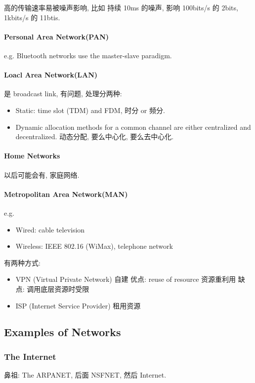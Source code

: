 高的传输速率易被噪声影响, 比如 持续 10ms 的噪声, 影响 100bits/s 的 2bits, 1kbits/s 的 11btis. 

\paragraph{Personal Area Network(PAN)} e.g. Bluetooth networks use the master-slave paradigm. 

\paragraph{Loacl Area Network(LAN)} 是 broadcast link, 有问题, 处理分两种:
\begin{itemize}
    \item Static: time slot (TDM) and FDM, 时分 or 频分. 
    \item Dynamic allocation methods for a common channel are either centralized and decentralized. 动态分配, 要么中心化, 要么去中心化. 
\end{itemize}

\paragraph{Home Networks} 以后可能会有, 家庭网络. 
\paragraph{Metropolitan Area Network(MAN)} e.g. 
\begin{itemize}
    \item Wired: cable television
    \item Wireless: IEEE 802.16 (WiMax), telephone network
\end{itemize}

有两种方式: 
\begin{itemize}
    \item VPN (Virtual Private Network) 自建
    \subitem 优点: reuse of resource 资源重利用
    \subitem 缺点: 调用底层资源时受限
    \item ISP (Internet Service Provider) 租用资源
\end{itemize}


\subsection{Examples of Networks}
\subsubsection{The Internet}
鼻祖: The ARPANET, 后面 NSFNET, 然后 Internet. 

